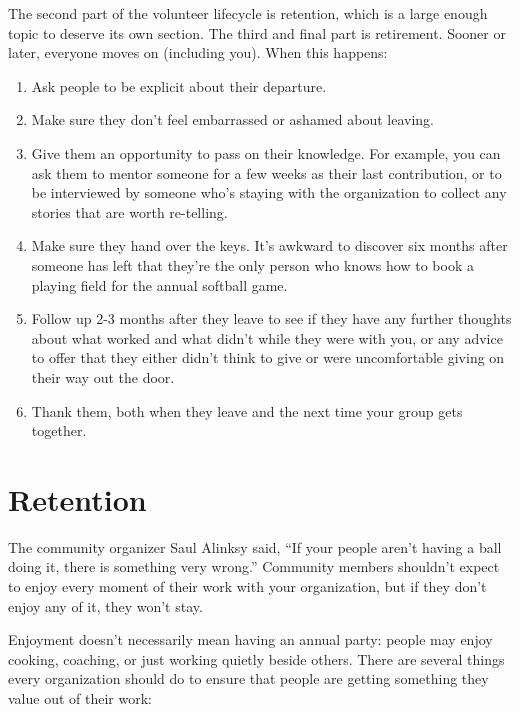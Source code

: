 \documentclass[10pt,statementpaper]{memoir}
\begin{document}
The second part of the volunteer lifecycle is retention, which is a
large enough topic to deserve its own section. The third and final part
is retirement. Sooner or later, everyone moves on (including you). When
this happens:

\begin{enumerate}
\def\labelenumi{\arabic{enumi}.}
\item
  Ask people to be explicit about their departure.
\item
  Make sure they don't feel embarrassed or ashamed about leaving.
\item
  Give them an opportunity to pass on their knowledge. For example, you
  can ask them to mentor someone for a few weeks as their last
  contribution, or to be interviewed by someone who's staying with the
  organization to collect any stories that are worth re-telling.
\item
  Make sure they hand over the keys. It's awkward to discover six months
  after someone has left that they're the only person who knows how to
  book a playing field for the annual softball game.
\item
  Follow up 2-3 months after they leave to see if they have any further
  thoughts about what worked and what didn't while they were with you,
  or any advice to offer that they either didn't think to give or were
  uncomfortable giving on their way out the door.
\item
  Thank them, both when they leave and the next time your group gets
  together.
\end{enumerate}

\section{Retention}\label{retention}

The community organizer Saul Alinksy said, ``If your people aren't
having a ball doing it, there is something very wrong.'' Community
members shouldn't expect to enjoy every moment of their work with your
organization, but if they don't enjoy any of it, they won't stay.

Enjoyment doesn't necessarily mean having an annual party: people may
enjoy cooking, coaching, or just working quietly beside others. There
are several things every organization should do to ensure that people
are getting something they value out of their work:
\end{document}
